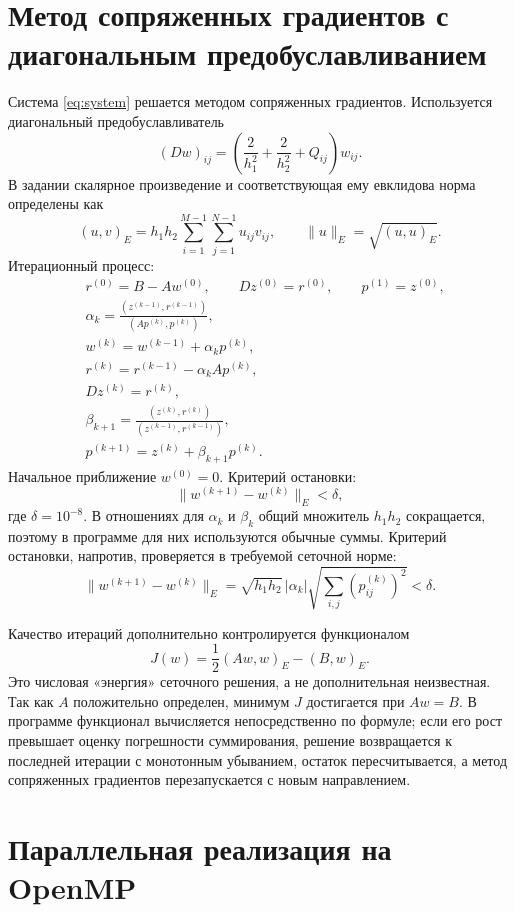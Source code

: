 \documentclass[12pt,a4paper]{article}
\begin{document}
\section{Метод сопряженных градиентов с диагональным предобуславливанием}

Система \eqref{eq:system} решается методом сопряженных градиентов. Используется диагональный предобуславливатель
\[
(Dw)_{ij}=\left(\frac{2}{h_1^2}+\frac{2}{h_2^2}+Q_{ij}\right)w_{ij}.
\]
В задании скалярное произведение и соответствующая ему евклидова норма определены как
\[
(u,v)_E=h_1h_2\sum_{i=1}^{M-1}\sum_{j=1}^{N-1}u_{ij}v_{ij},
\qquad
\|u\|_E=\sqrt{(u,u)_E}.
\]
Итерационный процесс:
\begin{align*}
&r^{(0)}=B-Aw^{(0)},\qquad Dz^{(0)}=r^{(0)},\qquad p^{(1)}=z^{(0)},\\
&\alpha_k=\frac{(z^{(k-1)},r^{(k-1)})}{(Ap^{(k)},p^{(k)})},\\
&w^{(k)}=w^{(k-1)}+\alpha_k p^{(k)},\\
&r^{(k)}=r^{(k-1)}-\alpha_k Ap^{(k)},\\
&Dz^{(k)}=r^{(k)},\\
&\beta_{k+1}=\frac{(z^{(k)},r^{(k)})}{(z^{(k-1)},r^{(k-1)})},\\
&p^{(k+1)}=z^{(k)}+\beta_{k+1}p^{(k)}.
\end{align*}
Начальное приближение \(w^{(0)}=0\). Критерий остановки:
\[
\|w^{(k+1)}-w^{(k)}\|_E<\delta,
\]
где \(\delta=10^{-8}\). В отношениях для \(\alpha_k\) и \(\beta_k\) общий множитель \(h_1h_2\) сокращается, поэтому в программе для них используются обычные суммы. Критерий остановки, напротив, проверяется в требуемой сеточной норме:
\[
\|w^{(k+1)}-w^{(k)}\|_E
=\sqrt{h_1h_2}\,|\alpha_k|\sqrt{\sum_{i,j}(p_{ij}^{(k)})^2}<\delta.
\]

Качество итераций дополнительно контролируется функционалом
\[
J(w)=\frac12(Aw,w)_E-(B,w)_E.
\]
Это числовая «энергия» сеточного решения, а не дополнительная неизвестная. Так как \(A\) положительно определен, минимум \(J\) достигается при \(Aw=B\). В программе функционал вычисляется непосредственно по формуле; если его рост превышает оценку погрешности суммирования, решение возвращается к последней итерации с монотонным убыванием, остаток пересчитывается, а метод сопряженных градиентов перезапускается с новым направлением.

\section{Параллельная реализация на OpenMP}
\end{document}
